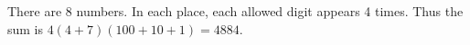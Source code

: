 There are 8 numbers. In each place, each allowed digit appears 4 times. Thus the sum is $4(4+7)(100+10+1)=\boxed{4884}$.
